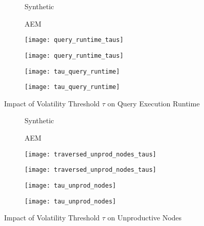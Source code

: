 \documentclass[abstracton,12pt]{scrartcl}
\theoremstyle{definition}
\begin{document}
\begin{figure}[h]
  \centering
  \begin{subfigure}{0.49\linewidth}
    \centering
    Synthetic
  \end{subfigure}
  \begin{subfigure}{0.49\linewidth}
    \centering
    AEM
  \end{subfigure}
  \begin{subfigure}{0.49\linewidth}
    \centering
    \texttt{[image: query\_runtime\_taus]}
    \caption{}
    \label{fig:query_runtime_taus_synthetic}
  \end{subfigure}
  \begin{subfigure}{0.49\linewidth}
    \centering
    \texttt{[image: query\_runtime\_taus]}
    \caption{}
    \label{fig:query_runtime_taus_aem}
  \end{subfigure}
  \begin{subfigure}{0.49\linewidth}
    \centering
    \texttt{[image: tau\_query\_runtime]}
    \caption{}
    \label{fig:tau_query_runtime_synthetic}
  \end{subfigure}
  \begin{subfigure}{0.49\linewidth}
    \centering
    \texttt{[image: tau\_query\_runtime]}
    \caption{}
    \label{fig:tau_query_runtime_aem}
  \end{subfigure}
\caption{Impact of Volatility Threshold $\tau$ on Query Execution Runtime}
\end{figure}

\begin{figure}[h]
  \centering
  \begin{subfigure}{0.49\linewidth}
    \centering
    Synthetic
  \end{subfigure}
  \begin{subfigure}{0.49\linewidth}
    \centering
    AEM
  \end{subfigure}
  \begin{subfigure}{0.49\linewidth}
    \centering
    \texttt{[image: traversed\_unprod\_nodes\_taus]}
    \caption{}
    \label{fig:trav_unprod_nodes_taus_synthetic}
  \end{subfigure}
  \begin{subfigure}{0.49\linewidth}
    \centering
    \texttt{[image: traversed\_unprod\_nodes\_taus]}
    \caption{}
    \label{fig:trav_unprod_nodes_taus_aem}
  \end{subfigure}
  \begin{subfigure}{0.49\linewidth}
    \centering
    \texttt{[image: tau\_unprod\_nodes]}
    \caption{}
    \label{fig:tau_unprod_nodes_synthetic}
  \end{subfigure}
  \begin{subfigure}{0.49\linewidth}
    \centering
    \texttt{[image: tau\_unprod\_nodes]}
    \caption{}
    \label{fig:tau_unprod_nodes_aem}
  \end{subfigure}
  \caption{Impact of Volatility Threshold $\tau$ on Unproductive Nodes}
  \label{fig:volatility_threshold}
\end{figure}
\end{document}
